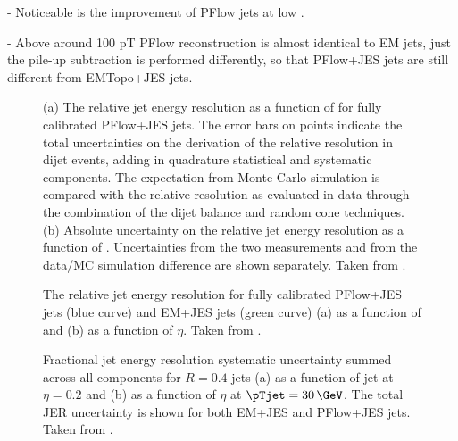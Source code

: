 - Noticeable is the improvement of PFlow jets at low \pT.

- Above around 100 pT PFlow reconstruction is almost identical to EM jets, just the pile-up subtraction is performed differently, so that PFlow+JES jets are still different from EMTopo+JES jets.



\FloatBarrier
\begin{figure}
    \caption{(a) The relative jet energy resolution as a function of \pT for fully calibrated PFlow+JES jets. The error bars on points indicate the total uncertainties on the derivation of the relative resolution in dijet events, adding in quadrature statistical and systematic components. The expectation from Monte Carlo simulation is compared with the relative resolution as evaluated in data through the combination of the dijet balance and random cone techniques. (b) Absolute uncertainty on the relative jet energy resolution as a function of \pTjet. Uncertainties from the two \insitu measurements and from the data/MC simulation difference are shown separately. Taken from .}
    \label{fig:jer-combination-incl-noise-term}
\end{figure}



\begin{figure}
    \caption{The relative jet energy resolution for fully calibrated PFlow+JES jets (blue curve) and EM+JES jets (green curve) (a) as a function of \pTjet and (b) as a function of $\eta$. Taken from .}
    \label{fig:jer-combination-results}
\end{figure}



\FloatBarrier
\begin{figure}[t]
    \caption{Fractional jet energy resolution systematic uncertainty summed across all components for \antikt $R = 0.4$ jets (a) as a function of jet \pTjet at $\eta = 0.2$ and (b) as a function of $\eta$ at $\pTjet = 30\,\GeV$. The total JER uncertainty is shown for both EM+JES and PFlow+JES jets. Taken from .}
    \label{fig:jer-combination-uncertainties}
\end{figure}




